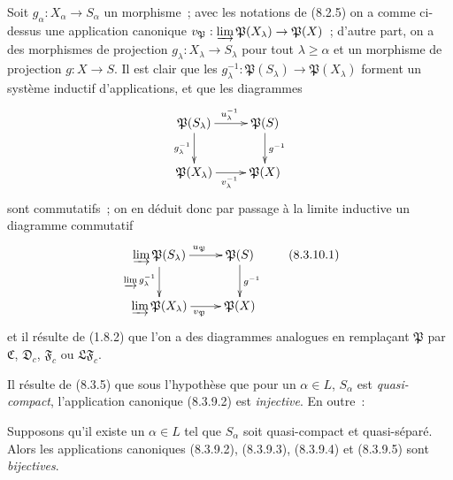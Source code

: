 \begin{env}[8.3.10]
\label{IV.8.3.10-fr}
Soit $g_\alpha:X_\alpha\to S_\alpha$ un morphisme~; avec les notations de
(8.2.5) on a comme ci-dessus une application canonique
$v_{\mathfrak P}:\varinjlim\mathfrak P(X_\lambda)\to\mathfrak P(X)$~;
d'autre part, on a des morphismes de projection
$g_\lambda:X_\lambda\to S_\lambda$ pour tout $\lambda\geq\alpha$ et un
morphisme de projection $g:X\to S$. Il est clair que les
$g_\lambda^{-1}:\mathfrak P(S_\lambda)\to\mathfrak P(X_\lambda)$ forment un
système inductif d'applications, et que les diagrammes
\[
\xymatrix{
  \mathfrak P(S_\lambda) \ar[r]^{u_\lambda^{-1}} \ar[d]_{g_\lambda^{-1}}
    & \mathfrak P(S) \ar[d]^{g^{-1}} \\
  \mathfrak P(X_\lambda) \ar[r]_{v_\lambda^{-1}} & \mathfrak P(X)
}
\]
sont commutatifs~; on en déduit donc par passage à la limite inductive un
diagramme commutatif
\begin{equation}
\xymatrix{
  \varinjlim\mathfrak P(S_\lambda) \ar[r]^{u_{\mathfrak P}}
    \ar[d]_{\varinjlim g_\lambda^{-1}}
    & \mathfrak P(S) \ar[d]^{g^{-1}} \\
  \varinjlim\mathfrak P(X_\lambda) \ar[r]_{v_{\mathfrak P}}
    & \mathfrak P(X)
}
\tag{8.3.10.1}\label{IV.8.3.10.1-fr}
\end{equation}
et il résulte de (1.8.2) que l'on a des diagrammes analogues en remplaçant
$\mathfrak P$ par $\mathfrak C$, $\mathfrak D_c$, $\mathfrak F_c$ ou
$\mathfrak{LF}_c$.
\end{env}

Il résulte de (8.3.5) que sous l'hypothèse que pour un $\alpha\in L$,
$S_\alpha$ est \emph{quasi-compact}, l'application canonique (8.3.9.2) est
\emph{injective}. En outre~:

\begin{theorem}[8.3.11]
\label{IV.8.3.11-fr}
Supposons qu'il existe un $\alpha\in L$ tel que $S_\alpha$ soit quasi-compact
et quasi-séparé. Alors les applications canoniques (8.3.9.2), (8.3.9.3),
(8.3.9.4) et (8.3.9.5) sont \emph{bijectives}.
\end{theorem}

